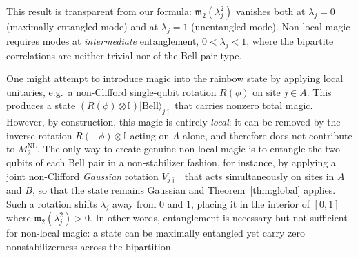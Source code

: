 \documentclass[aps,prl,twocolumn,superscriptaddress,reprint,longbibliography,nofootinbib]{revtex4-2}
\begin{document}
This result is transparent from our formula: $\mathfrak{m}_2(\lambda_j^2)$ vanishes both at $\lambda_j = 0$  (maximally entangled mode) and at $\lambda_j = 1$  (unentangled mode). Non-local magic requires modes at \emph{intermediate} entanglement, $0 < \lambda_j < 1$, where the bipartite correlations are neither trivial nor of the Bell-pair type.

One might attempt to introduce magic into the rainbow state by applying local unitaries, e.g.\ a non-Clifford single-qubit rotation $R(\phi)$ on site $j\in A$. This produces a state $(R(\phi)\otimes \mathbb{I})|\mathrm{Bell}\rangle_{j\bar\jmath}$ that carries nonzero total magic. However, by construction, this magic is entirely \emph{local}: it can be removed by the inverse rotation $R(-\phi)\otimes \mathbb{I}$ acting on $A$ alone, and therefore does not contribute to $M_2^{\mathrm{NL}}$. The only way to create genuine non-local magic is to entangle the two qubits of each Bell pair in a non-stabilizer fashion, for instance, by applying a joint non-Clifford \emph{Gaussian} rotation $V_{j\bar\jmath}$~\cite{huang2026dismagickerunitarygatenonstabilizerness} that acts simultaneously on sites in $A$ and $B$, so that the state remains Gaussian and Theorem~\ref{thm:global} applies. Such a rotation shifts $\lambda_j$ away from $0$ and $1$, placing it in the interior of $[0,1]$ where $\mathfrak{m}_2(\lambda_j^2) > 0$. In other words, entanglement is necessary but not sufficient for non-local magic: a state can be maximally entangled yet carry zero nonstabilizerness across the bipartition.
\end{document}

